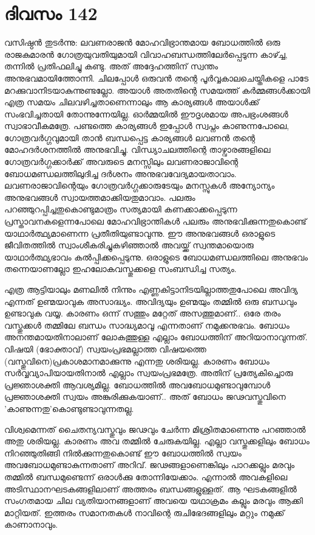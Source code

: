 \newpage
\section{ദിവസം 142}


വസിഷ്ഠൻ തുടർന്നു: ലവണരാജൻ മോഹവിഭ്രാന്തമായ ബോധത്തിൽ ഒരു രാജകുമാരൻ ഗോത്രയുവതിയുമായി വിവാഹബന്ധത്തിലേർപ്പെടുന്ന കാഴ്ച്ച, തന്നിൽ പ്രതിഫലിച്ചു കണ്ടു. അത് അദ്ദേഹത്തിന്‌ സ്വന്തം അനുഭവമായിത്തോന്നി. ചിലപ്പോൾ ഒരുവൻ തന്റെ പൂർവ്വകാലചെയ്തികളെ പാടേ മറക്കുവാനിടയാകുന്നുണ്ടല്ലോ. അയാൾ അതതിന്റെ സമയത്ത് കർമ്മങ്ങൾക്കായി എത്ര സമയം ചിലവഴിച്ചതാണെന്നാലും ആ കാര്യങ്ങൾ അയാൾക്ക് സംഭവിച്ചതായി തോന്നുന്നേയില്ല. ഓർമ്മയിൽ ഈദൃശമായ അപഭ്രംശങ്ങൾ സ്വാഭാവീകമത്രേ. പണ്ടത്തെ കാര്യങ്ങൾ ഇപ്പോൾ സ്വപ്നം കാണുന്നപോലെ, ഗോത്രവർഗ്ഗവുമായി താൻ ബന്ധപ്പെട്ട കാര്യങ്ങൾ ലവണൻ തന്റെ മോഹദർശനത്തിൽ അനുഭവിച്ചു. വിന്ധ്യാചലത്തിന്റെ താഴ്വാരങ്ങളിലെ ഗോത്രവർഗ്ഗക്കാർക്ക് അവരുടെ മനസ്സിലും ലവണരാജാവിന്റെ ബോധമണ്ഡലത്തിലുദിച്ച ദർശനം അനുഭവവേദ്യമായതാവാം. ലവണരാജാവിന്റെയും ഗോത്രവർഗ്ഗക്കാരുടേയും മനസ്സുകൾ അന്യോന്യം അനുഭവങ്ങൾ സ്വായത്തമാക്കിയതുമാവാം. പലരും പറഞ്ഞുറപ്പിച്ചതുകൊണ്ടുമാത്രം സത്യമായി കണക്കാക്കപ്പെടുന്ന പ്രസ്താവനകളെന്നപോലെ മോഹവിഭ്രാന്തികൾ പലരും അനുഭവിക്കുന്നതുകൊണ്ട് യാഥാർത്ഥ്യമാണെന്ന പ്രതീതിയുണ്ടാവുന്നു. ഈ അനുഭവങ്ങൾ ഒരാളുടെ ജീവിതത്തിൽ സ്വാംശീകരിച്ചുകഴിഞ്ഞാൽ അവയ്ക്ക് സ്വന്തമായൊരു യാഥാർത്ഥ്യഭാവം കൽപ്പിക്കപ്പെടുന്നു. ഒരാളുടെ ബോധമണ്ഡലത്തിലെ അനുഭവം തന്നെയാണല്ലോ ഇഹലോകവസ്തുക്കളെ സംബന്ധിച്ച സത്യം.

എത്ര ആട്ടിയാലും മണലിൽ നിന്നും എണ്ണകിട്ടാനിടയില്ലാത്തതുപോലെ അവിദ്യ എന്നത് ഉണ്മയാവുക അസാദ്ധ്യം. അവിദ്യയും ഉണ്മയും തമ്മിൽ ഒരു ബന്ധവും ഉണ്ടാവുക വയ്യ. കാരണം ഒന്ന് സത്തും മറ്റേത് അസത്തുമാണ്‌.. ഒരേ തരം വസ്തുക്കൾ തമ്മിലേ ബന്ധം സാദ്ധ്യമാവൂ എന്നതാണ്‌ നമുക്കനുഭവം. ബോധം അനന്തമായതിനാലാണ്‌ ലോകത്തുള്ള എല്ലാം ബോധത്തിന്‌ അറിയാനാവുന്നത്. വിഷയി (ഭോക്താവ്) സ്വയംപ്രഭമല്ലാത്ത വിഷയത്തെ (വസ്തുവിനെ)പ്രകാശമാനമാക്കുന്നു എന്നതു ശരിയല്ല. കാരണം ബോധം സർവ്വവ്യാപിയായതിനാൽ എല്ലാം സ്വയംപ്രഭമത്രേ. അതിന്‌ പ്രത്യേകിച്ചൊരു പ്രജ്ഞാശക്തി ആവശ്യമില്ല. ബോധത്തിൽ അവബോധമുണ്ടാവുമ്പോൾ പ്രജ്ഞാശക്തി സ്വയം അങ്കുരിക്കുകയാണ്‌.. അത് ബോധം ജഢവസ്തുവിനെ 'കാണുന്നതു'കൊണ്ടുണ്ടാവുന്നതല്ല.

വിശ്വമെന്നത് ചൈതന്യവസ്തുവും ജഢവും ചേർന്ന മിശ്രിതമാണെന്നു പറഞ്ഞാൽ അതു ശരിയല്ല. കാരണം അവ തമ്മിൽ ചേരുകയില്ല. എല്ലാ വസ്തുക്കളിലും ബോധം നിറഞ്ഞുതിങ്ങി നിൽക്കുന്നതുകൊണ്ട് ഈ ബോധത്തിൽ സ്വയം അവബോധമുണ്ടാകുന്നതാണ്‌ അറിവ്. ജഢങ്ങളാണെങ്കിലും പാറക്കല്ലും മരവും തമ്മിൽ ബന്ധമുണ്ടെന്ന് ഒരാൾക്കു തോന്നിയേക്കാം. എന്നാൽ അവകളിലെ അടിസ്ഥാനഘടകങ്ങളിലാണ്‌ അത്തരം ബന്ധങ്ങളുള്ളത്. ആ ഘടകങ്ങളിൽ സംഗതമായ ചില വ്യതിയാനങ്ങളാണ്‌ അവയെ യഥാക്രമം കല്ലും മരവും ആക്കി മാറ്റിയത്. ഇത്തരം സമാനതകൾ നാവിന്റെ രുചിഭേദങ്ങളിലും മറ്റും നമുക്ക് കാണാനാവും. 

